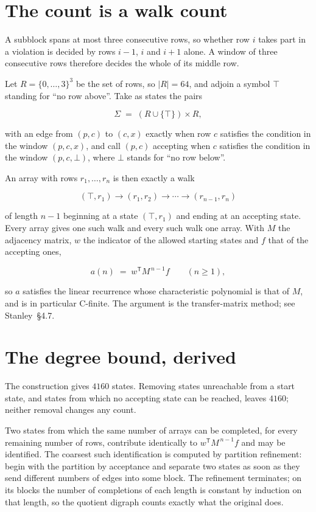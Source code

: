 \documentclass[11pt]{article}
\theoremstyle{definition}
\begin{document}
\section{The count is a walk count}

A subblock spans at most three consecutive rows, so whether row $i$ takes part in a violation is decided by rows $i-1$, $i$ and $i+1$ alone. A window of three consecutive rows therefore decides the whole of its middle row.

Let $R = \{0,\dots,3\}^{3}$ be the set of rows, so $|R| = 64$, and adjoin a symbol $\top$ standing for ``no row above''. Take as states the pairs

\[\Sigma \;=\; (R \cup \{\top\}) \times R,\]

with an edge from $(p,c)$ to $(c,x)$ exactly when row $c$ satisfies the condition in the window $(p,c,x)$, and call $(p,c)$ accepting when $c$ satisfies the condition in the window $(p,c,\bot)$, where $\bot$ stands for ``no row below''.

An array with rows $r_1,\dots,r_n$ is then exactly a walk

\[(\top,r_1) \to (r_1,r_2) \to \cdots \to (r_{n-1},r_n)\]

of length $n-1$ beginning at a state $(\top,r_1)$ and ending at an accepting state. Every array gives one such walk and every such walk one array. With $M$ the adjacency matrix, $w$ the indicator of the allowed starting states and $f$ that of the accepting ones,

\[a(n) \;=\; w^{\mathsf T} M^{\,n-1} f \qquad (n \ge 1),\]

so $a$ satisfies the linear recurrence whose characteristic polynomial is that of $M$, and is in particular C-finite. The argument is the transfer-matrix method; see Stanley~\S4.7.

\section{The degree bound, derived}

The construction gives $4160$ states. Removing states unreachable from a start state, and states from which no accepting state can be reached, leaves $4160$; neither removal changes any count.

Two states from which the same number of arrays can be completed, for every remaining number of rows, contribute identically to $w^{\mathsf T}M^{\,n-1}f$ and may be identified. The coarsest such identification is computed by partition refinement: begin with the partition by acceptance and separate two states as soon as they send different numbers of edges into some block. The refinement terminates; on its blocks the number of completions of each length is constant by induction on that length, so the quotient digraph counts exactly what the original does.
\end{document}
